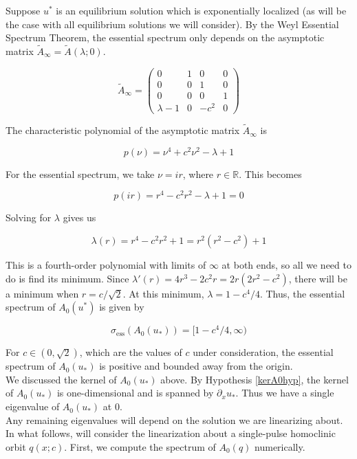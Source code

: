 \documentclass[12pt]{article}
\def\R{{\mathbb R}}
\begin{document}
Suppose $u^*$ is an equilibrium solution which is exponentially localized (as will be the case with all equilibrium solutions we will consider). By the Weyl Essential Spectrum Theorem, the essential spectrum only depends on the asymptotic matrix $\tilde{A}_\infty = \tilde{A}(\lambda; 0)$.

\begin{equation}
\tilde{A}_\infty = \begin{pmatrix}
0 & 1 & 0 & 0 \\
0 & 0 & 1 & 0 \\
0 & 0 & 0 & 1 \\
\lambda - 1 & 0 & -c^2 & 0 
\end{pmatrix}
\end{equation}

The characteristic polynomial of the asymptotic matrix $\tilde{A}_\infty$ is 

\[
p(\nu) = \nu^4 + c^2 \nu^2 - \lambda + 1
\]

For the essential spectrum, we take $\nu = i r$, where $r \in \R$. This becomes

\[
p(i r) = r^4 - c^2 r^2 - \lambda + 1 = 0
\]

Solving for $\lambda$ gives us

\[
\lambda(r) = r^4 - c^2 r^2 + 1 = r^2(r^2 - c^2) + 1
\]

This is a fourth-order polynomial with limits of $\infty$ at both ends, so all we need to do is find its minimum. Since $\lambda'(r) = 4 r^3 - 2 c^2 r = 2 r(2 r^2 - c^2)$, there will be a minimum when $r = c/\sqrt{2}$. At this minimum, $\lambda = 1 - c^4/4$. Thus, the essential spectrum of $A_0(u^*)$ is given by

\begin{equation}\label{A0ess}
\sigma_{\text{ess}}(A_0(u_*)) = [1 - c^4/4, \infty)
\end{equation}

For $c \in (0, \sqrt{2})$, which are the values of $c$ under consideration, the essential spectrum of $A_0(u_*)$ is positive and bounded away from the origin.\\

We discussed the kernel of $A_0(u_*)$ above. By Hypothesis \ref{kerA0hyp}, the kernel of $A_0(u_*)$ is one-dimensional and is spanned by $\partial_x u_*$. Thus we have a single eigenvalue of $A_0(u_*)$ at 0. \\

Any remaining eigenvalues will depend on the solution we are linearizing about. In what follows, will consider the linearization about a single-pulse homoclinic orbit $q(x; c)$. First, we compute the spectrum of $A_0(q)$ numerically.
\end{document}
